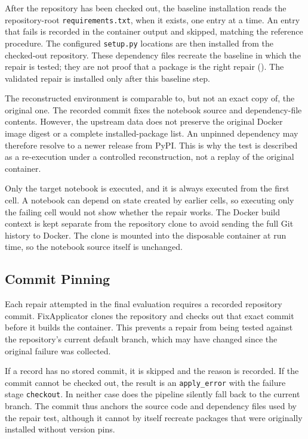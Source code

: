 After the repository has been checked out, the baseline installation reads the
repository-root \texttt{requirements.txt}, when it exists, one entry at a time.
An entry that fails is recorded in the container output and skipped, matching
the reference procedure. The configured \texttt{setup.py} locations are then
installed from the checked-out repository. These dependency files recreate the
baseline in which the repair is tested; they are not proof that a package is the
right repair (). The validated repair is installed
only after this baseline step.

The reconstructed environment is comparable to, but not an exact copy of, the
original one. The recorded commit fixes the notebook source and dependency-file
contents. However, the upstream data does not preserve the original Docker image
digest or a complete installed-package list. An unpinned dependency may therefore
resolve to a newer release from PyPI. This is why the test is described as a
re-execution under a controlled reconstruction, not a replay of the original
container.

Only the target notebook is executed, and it is always executed from the first
cell. A notebook can depend on state created by earlier cells, so executing only
the failing cell would not show whether the repair works. The Docker build context
is kept separate from the repository clone to avoid sending the full Git history
to Docker. The clone is mounted into the disposable container at run time, so the
notebook source itself is unchanged.

\subsection{Commit Pinning}

Each repair attempted in the final evaluation requires a recorded repository
commit. FixApplicator clones the repository and checks out that exact commit
before it builds the container. This prevents a repair from being tested against
the repository's current default branch, which may have changed since the
original failure was collected.

If a record has no stored commit, it is skipped and the reason is recorded. If
the commit cannot be checked out, the result is an \texttt{apply\_error} with
the failure stage \texttt{checkout}. In neither case does the pipeline silently
fall back to the current branch. The commit thus anchors the source code and
dependency files used by the repair test, although it cannot by itself recreate
packages that were originally installed without version pins.

